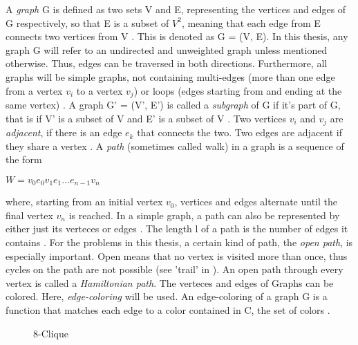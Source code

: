 \documentclass[12pt,a4paper]{article}
\begin{document}
A \textit{graph} G is defined as two sets V and E, representing the vertices and edges of G respectively, so that E is a subset of $ V ^ 2$, meaning that each edge from E connects two vertices from V \citep{Bollobas1998}. This is denoted as G = (V, E). In this thesis, any graph G will refer to an undirected and unweighted graph unless mentioned otherwise. Thus, edges can be traversed in both directions. Furthermore, all graphs will be simple graphs, not containing multi-edges (more than one edge from a vertex $v_i$ to a vertex $v_j$) or loops (edges starting from and ending at the same vertex) \citep{Gross2013}. 
\newline
\newline
A graph G' = (V', E') is called a \textit{subgraph} of G if it's part of G, that is if V' is a subset of V and E' is a subset of V \citep{Bollobas1998}.
\newline
\newline
Two vertices $v_i$ and $v_j$ are \textit{adjacent}, if there is an edge $e_k$ that connects the two. Two edges are adjacent if they share a vertex \citep{Bollobas1998}. 
\newline
\newline
A \textit{path} (sometimes called walk) in a graph is a sequence of the form 
\begin{center}
	$ W = v_0 e_0 v_1 e_1...e_{n-1} v_n $
\end{center}
where, starting from an initial vertex $v_0$, vertices and edges alternate until the final vertex $v_n$ is reached. In a simple graph, a path can also be represented by either just its verteces \citep{Gross2013} or edges \citep{Bollobas1998}. The length l of a path is the number of edges it contains \citep{Gross2013}.
\newline
\newline
For the problems in this thesis, a certain kind of path, the \textit{open path}, is especially important. Open means that no vertex is visited more than once, thus cycles on the path are not possible (see 'trail' in \citep{Gross2013}). An open path through every vertex is called a \textit{Hamiltonian path}.
\newline
\newline
The verteces and edges of Graphs can be colored. Here, \textit{edge-coloring} will be used. An edge-coloring of a graph G is a function that matches each edge to a color contained in C, the set of colors \citep{Gross2013}. 
\newpage
\begin{wrapfigure}{r}{4cm}
	
	\caption{8-Clique}
\end{wrapfigure}
\end{document}
